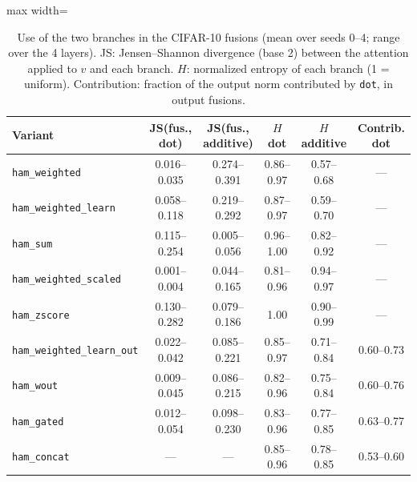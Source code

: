 
\begin{table}[!t]
\centering
\footnotesize
\caption{Use of the two branches in the CIFAR-10 fusions (mean over seeds 0--4; range over the 4 layers). JS: Jensen--Shannon divergence (base 2) between the attention applied to $v$ and each branch. $H$: normalized entropy of each branch (1 = uniform). Contribution: fraction of the output norm contributed by \texttt{dot}, in output fusions.}
\label{tab:colapso}
\begin{adjustbox}{max width=\linewidth}
\begin{tabular}{lccccc}
\toprule
Variant & JS(fus., dot) & JS(fus., additive) & $H$ dot & $H$ additive & Contrib. dot \\
\midrule
\texttt{ham\_weighted} & 0.016--0.035 & 0.274--0.391 & 0.86--0.97 & 0.57--0.68 & --- \\
\texttt{ham\_weighted\_learn} & 0.058--0.118 & 0.219--0.292 & 0.87--0.97 & 0.59--0.70 & --- \\
\texttt{ham\_sum} & 0.115--0.254 & 0.005--0.056 & 0.96--1.00 & 0.82--0.92 & --- \\
\texttt{ham\_weighted\_scaled} & 0.001--0.004 & 0.044--0.165 & 0.81--0.96 & 0.94--0.97 & --- \\
\texttt{ham\_zscore} & 0.130--0.282 & 0.079--0.186 & 1.00 & 0.90--0.99 & --- \\
\texttt{ham\_weighted\_learn\_out} & 0.022--0.042 & 0.085--0.221 & 0.85--0.97 & 0.71--0.84 & 0.60--0.73 \\
\texttt{ham\_wout} & 0.009--0.045 & 0.086--0.215 & 0.82--0.96 & 0.75--0.84 & 0.60--0.76 \\
\texttt{ham\_gated} & 0.012--0.054 & 0.098--0.230 & 0.83--0.96 & 0.77--0.85 & 0.63--0.77 \\
\texttt{ham\_concat} & --- & --- & 0.85--0.96 & 0.78--0.85 & 0.53--0.60 \\
\bottomrule
\end{tabular}
\end{adjustbox}
\end{table}
